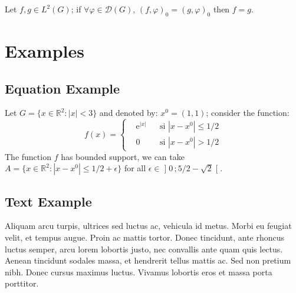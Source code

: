 \documentclass[
	11pt,
	fleqn,
	a4paper,
]{LegrandOrangeBook}
\begin{document}
\begin{proposition} %
	Let $f,g\in L^2(G)$; if $\forall \varphi\in\mathcal{D}(G)$, $(f,\varphi)_0=(g,\varphi)_0$ then $f = g$.
\end{proposition}


\section{Examples}

\subsection{Equation Example}

\begin{example} %
	Let $G=\{x\in\mathbb{R}^2:|x|<3\}$ and denoted by: $x^0=(1,1)$; consider the function:
	\begin{equation}
		f(x)=\left\{\begin{aligned}                                                                                                                                                                  & \mathrm{e}^{|x|} &  & \text{si $|x-x^0|\leq 1/2$} \\
                                                                                                                                                                                 & 0                &  & \text{si $|x-x^0|> 1/2$}\end{aligned}\right.
	\end{equation}
	The function $f$ has bounded support, we can take $A=\{x\in\mathbb{R}^2:|x-x^0|\leq 1/2+\epsilon\}$ for all $\epsilon\in\mathopen{]}0\,;5/2-\sqrt{2}\mathclose{[}$.
\end{example}

\subsection{Text Example}

\begin{example}[Example name] %
	Aliquam arcu turpis, ultrices sed luctus ac, vehicula id metus. Morbi eu feugiat velit, et tempus augue. Proin ac mattis tortor. Donec tincidunt, ante rhoncus luctus semper, arcu lorem lobortis justo, nec convallis ante quam quis lectus. Aenean tincidunt sodales massa, et hendrerit tellus mattis ac. Sed non pretium nibh. Donec cursus maximus luctus. Vivamus lobortis eros et massa porta porttitor.
\end{example}
\end{document}
